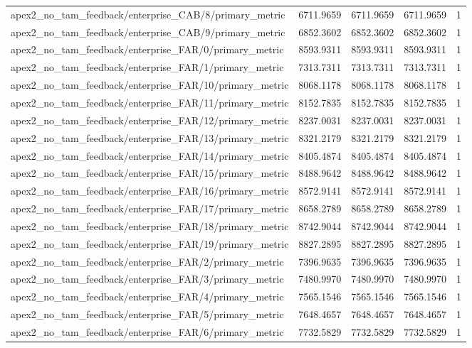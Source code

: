 \begin{table}[h]
\begin{tabular}{lrrrr}
apex2_no_tam_feedback/enterprise_CAB/8/primary_metric & 6711.9659 & 6711.9659 & 6711.9659 & 1 \\
apex2_no_tam_feedback/enterprise_CAB/9/primary_metric & 6852.3602 & 6852.3602 & 6852.3602 & 1 \\
apex2_no_tam_feedback/enterprise_FAR/0/primary_metric & 8593.9311 & 8593.9311 & 8593.9311 & 1 \\
apex2_no_tam_feedback/enterprise_FAR/1/primary_metric & 7313.7311 & 7313.7311 & 7313.7311 & 1 \\
apex2_no_tam_feedback/enterprise_FAR/10/primary_metric & 8068.1178 & 8068.1178 & 8068.1178 & 1 \\
apex2_no_tam_feedback/enterprise_FAR/11/primary_metric & 8152.7835 & 8152.7835 & 8152.7835 & 1 \\
apex2_no_tam_feedback/enterprise_FAR/12/primary_metric & 8237.0031 & 8237.0031 & 8237.0031 & 1 \\
apex2_no_tam_feedback/enterprise_FAR/13/primary_metric & 8321.2179 & 8321.2179 & 8321.2179 & 1 \\
apex2_no_tam_feedback/enterprise_FAR/14/primary_metric & 8405.4874 & 8405.4874 & 8405.4874 & 1 \\
apex2_no_tam_feedback/enterprise_FAR/15/primary_metric & 8488.9642 & 8488.9642 & 8488.9642 & 1 \\
apex2_no_tam_feedback/enterprise_FAR/16/primary_metric & 8572.9141 & 8572.9141 & 8572.9141 & 1 \\
apex2_no_tam_feedback/enterprise_FAR/17/primary_metric & 8658.2789 & 8658.2789 & 8658.2789 & 1 \\
apex2_no_tam_feedback/enterprise_FAR/18/primary_metric & 8742.9044 & 8742.9044 & 8742.9044 & 1 \\
apex2_no_tam_feedback/enterprise_FAR/19/primary_metric & 8827.2895 & 8827.2895 & 8827.2895 & 1 \\
apex2_no_tam_feedback/enterprise_FAR/2/primary_metric & 7396.9635 & 7396.9635 & 7396.9635 & 1 \\
apex2_no_tam_feedback/enterprise_FAR/3/primary_metric & 7480.9970 & 7480.9970 & 7480.9970 & 1 \\
apex2_no_tam_feedback/enterprise_FAR/4/primary_metric & 7565.1546 & 7565.1546 & 7565.1546 & 1 \\
apex2_no_tam_feedback/enterprise_FAR/5/primary_metric & 7648.4657 & 7648.4657 & 7648.4657 & 1 \\
apex2_no_tam_feedback/enterprise_FAR/6/primary_metric & 7732.5829 & 7732.5829 & 7732.5829 & 1 \\

\end{tabular}
\end{table}

